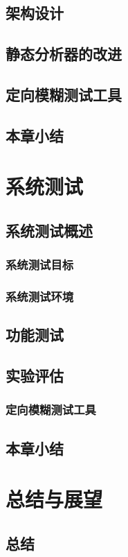 \documentclass[bachelor]{njupthesis}
\begin{document}
\section{架构设计}
\section{静态分析器的改进}
\section{定向模糊测试工具}
\section{本章小结}

\chapter{系统测试}
\section{系统测试概述}
\subsection{系统测试目标}
\subsection{系统测试环境}
\section{功能测试}
\section{实验评估}
\subsection{定向模糊测试工具}
\section{本章小结}


\chapter{总结与展望}
\section{总结}
\end{document}
